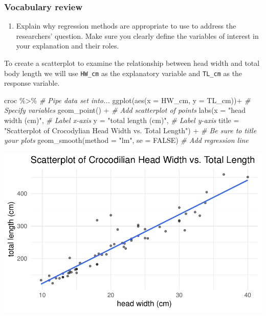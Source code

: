 \documentclass[
]{report}
\newenvironment{Shaded}{\begin{snugshade}}{\end{snugshade}}
\newcommand{\AttributeTok}[1]{\textcolor[rgb]{0.77,0.63,0.00}{#1}}
\newcommand{\CommentTok}[1]{\textcolor[rgb]{0.56,0.35,0.01}{\textit{#1}}}
\newcommand{\ConstantTok}[1]{\textcolor[rgb]{0.00,0.00,0.00}{#1}}
\newcommand{\FunctionTok}[1]{\textcolor[rgb]{0.00,0.00,0.00}{#1}}
\newcommand{\NormalTok}[1]{#1}
\newcommand{\SpecialCharTok}[1]{\textcolor[rgb]{0.00,0.00,0.00}{#1}}
\newcommand{\StringTok}[1]{\textcolor[rgb]{0.31,0.60,0.02}{#1}}
\providecommand{\tightlist}{%
  \setlength{\itemsep}{0pt}\setlength{\parskip}{0pt}}
\begin{document}
\hypertarget{vocabulary-review}{%
\subsubsection*{Vocabulary review}\label{vocabulary-review}}

\begin{enumerate}
\def\labelenumi{\arabic{enumi}.}
\tightlist
\item
  Explain why regression methods are appropriate to use to address the researchers' question. Make sure you clearly define the variables of interest in your explanation and their roles.
\end{enumerate}

\vspace{.5in}

To create a scatterplot to examine the relationship between head width and total body length we will use \texttt{HW\_cm} as the explanatory variable and \texttt{TL\_cm} as the response variable.

\begin{Shaded}
\begin{Highlighting}[]
\NormalTok{croc }\SpecialCharTok{\%\textgreater{}\%} \CommentTok{\# Pipe data set into...}
\FunctionTok{ggplot}\NormalTok{(}\FunctionTok{aes}\NormalTok{(}\AttributeTok{x =}\NormalTok{ HW\_cm, }\AttributeTok{y =}\NormalTok{ TL\_cm))}\SpecialCharTok{+}  \CommentTok{\# Specify variables}
  \FunctionTok{geom\_point}\NormalTok{() }\SpecialCharTok{+}  \CommentTok{\# Add scatterplot of points}
  \FunctionTok{labs}\NormalTok{(}\AttributeTok{x =} \StringTok{"head width (cm)"}\NormalTok{,  }\CommentTok{\# Label x{-}axis}
       \AttributeTok{y =} \StringTok{"total length (cm)"}\NormalTok{,  }\CommentTok{\# Label y{-}axis}
       \AttributeTok{title =} \StringTok{"Scatterplot of Crocodylian Head Width vs. Total Length"}\NormalTok{) }\SpecialCharTok{+} 
               \CommentTok{\# Be sure to title your plots}
  \FunctionTok{geom\_smooth}\NormalTok{(}\AttributeTok{method =} \StringTok{"lm"}\NormalTok{, }\AttributeTok{se =} \ConstantTok{FALSE}\NormalTok{)  }\CommentTok{\# Add regression line}
\end{Highlighting}
\end{Shaded}

\begin{center}\includegraphics[width=0.7\linewidth]{13-OCA10-regression-simulation_files/figure-latex/unnamed-chunk-2-1} \end{center}
\end{document}
